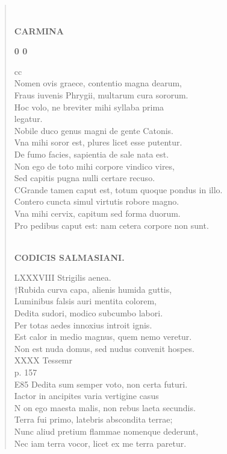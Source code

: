 \documentclass[11pt, a4paper]{report}
\begin{document}
\begin{verse}
        ﻿\pagebreak 
    \begin{center} \textbf{CARMINA} \end{center}\begin{center} \textbf{0 0} \end{center}cc \\ Nomen ovis graece, contentio magna dearum, \\ Fraus iuvenis Phrygii, multarum cura sororum. \\ Hoc volo, ne breviter mihi syllaba prima \\ legatur. \\ Nobile duco genus magni de gente Catonis. \\ Vna mihi soror est, plures licet esse putentur. \\ De fumo facies, sapientia de sale nata est. \\ Non ego de toto mihi corpore vindico vires, \\ Sed capitis pugna nulli certare recuso. \\ CGrande tamen caput est, totum quoque pondus in illo. \\ Contero cuncta simul virtutis robore magno. \\ Vna mihi cervix, capitum sed forma duorum. \\ Pro pedibus caput est: nam cetera corpore non sunt. \\ 
        ﻿\pagebreak 
    \begin{center} \textbf{CODICIS SALMASIANI.} \end{center} \marginpar{[01]} LXXXVIII Strigilis aenea. \\ †Rubida curva capa, alienis humida guttis, \\ Luminibus falsis auri mentita colorem, \\ Dedita sudori, modico subcumbo labori. \\ Per totas aedes innoxius introit ignis. \\ Est calor in medio magnus, quem nemo veretur. \\ Non est nuda domus, sed nudus convenit hospes. \\ XXXX Tessemr \\ p. 157 \\ E85 Dedita sum semper voto, non certa futuri. \\ Iactor in ancipites varia vertigine casus \\ N on ego maesta malis, non rebus laeta secundis. \\ Terra fui primo, latebris abscondita terrae; \\ Nunc aliud pretium flammae nomenque dederunt, \\ Nec iam terra vocor, licet ex me terra paretur. \\ 

\end{verse}
\end{document}
